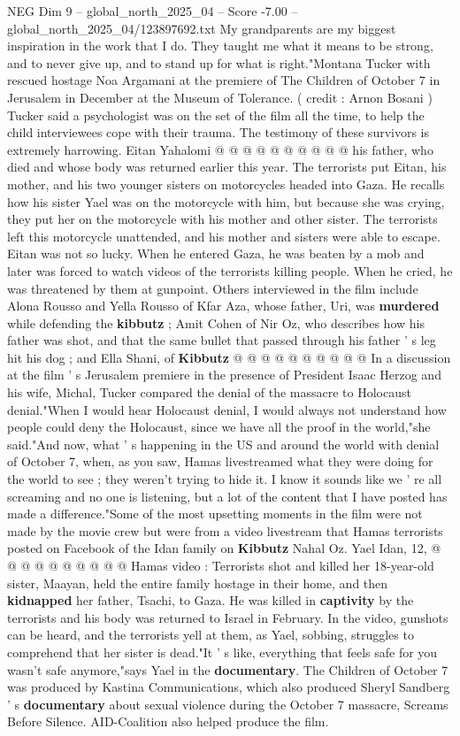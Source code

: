 \begin{textsample}{NEG Dim 9 – global\_north\_2025\_04 – Score -7.00 – global\_north\_2025\_04/123897692.txt}
My grandparents are my biggest inspiration in the work that I do.
They taught me what it means to be strong, and to never give up, and to stand up for what is right."Montana Tucker with rescued hostage Noa Argamani at the premiere of The Children of October 7 in Jerusalem in December at the Museum of Tolerance. ( credit : Arnon Bosani ) Tucker said a psychologist was on the set of the film all the time, to help the child interviewees cope with their trauma.
The testimony of these survivors is extremely harrowing.
Eitan Yahalomi @ @ @ @ @ @ @ @ @ @ his father, who died and whose body was returned earlier this year.
The terrorists put Eitan, his mother, and his two younger sisters on motorcycles headed into Gaza.
He recalls how his sister Yael was on the motorcycle with him, but because she was crying, they put her on the motorcycle with his mother and other sister.
The terrorists left this motorcycle unattended, and his mother and sisters were able to escape.
Eitan was not so lucky.
When he entered Gaza, he was beaten by a mob and later was forced to watch videos of the terrorists killing people.
When he cried, he was threatened by them at gunpoint.
Others interviewed in the film include Alona Rousso and Yella Rousso of Kfar Aza, whose father, Uri, was \textbf{murdered} while defending the \textbf{kibbutz} ; Amit Cohen of Nir Oz, who describes how his father was shot, and that the same bullet that passed through his father ' s leg hit his dog ; and Ella Shani, of \textbf{Kibbutz} @ @ @ @ @ @ @ @ @ @ In a discussion at the film ' s Jerusalem premiere in the presence of President Isaac Herzog and his wife, Michal, Tucker compared the denial of the massacre to Holocaust denial."When I would hear Holocaust denial, I would always not understand how people could deny the Holocaust, since we have all the proof in the world,"she said."And now, what ' s happening in the US and around the world with denial of October 7, when, as you saw, Hamas livestreamed what they were doing for the world to see ; they weren't trying to hide it.
I know it sounds like we ' re all screaming and no one is listening, but a lot of the content that I have posted has made a difference."Some of the most upsetting moments in the film were not made by the movie crew but were from a video livestream that Hamas terrorists posted on Facebook of the Idan family on \textbf{Kibbutz} Nahal Oz.
Yael Idan, 12, @ @ @ @ @ @ @ @ @ @ Hamas video : Terrorists shot and killed her 18-year-old sister, Maayan, held the entire family hostage in their home, and then \textbf{kidnapped} her father, Tsachi, to Gaza.
He was killed in \textbf{captivity} by the terrorists and his body was returned to Israel in February.
In the video, gunshots can be heard, and the terrorists yell at them, as Yael, sobbing, struggles to comprehend that her sister is dead."It ' s like, everything that feels safe for you wasn't safe anymore,"says Yael in the \textbf{documentary}.
The Children of October 7 was produced by Kastina Communications, which also produced Sheryl Sandberg ' s \textbf{documentary} about sexual violence during the October 7 massacre, Screams Before Silence.
AID-Coalition also helped produce the film.


\end{textsample}
